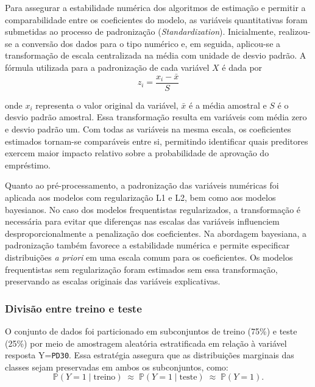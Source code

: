 \documentclass[
  brazilian,
  12pt,
  letterpaper,
  DIV=11,
  numbers=noendperiod]{scrartcl}
\begin{document}
Para assegurar a estabilidade numérica dos algoritmos de estimação e
permitir a comparabilidade entre os coeficientes do modelo, as variáveis
quantitativas foram submetidas ao processo de padronização
(\emph{Standardization}). Inicialmente, realizou-se a conversão dos
dados para o tipo numérico e, em seguida, aplicou-se a transformação de
escala centralizada na média com unidade de desvio padrão. A fórmula
utilizada para a padronização de cada variável \(X\) é dada por
\begin{equation}
z_i = \frac{x_i - \bar{x}}{S}
\label{standardization}
\end{equation}

onde \(x_i\) representa o valor original da variável, \(\bar{x}\) é a
média amostral e \(S\) é o desvio padrão amostral. Essa transformação
resulta em variáveis com média zero e desvio padrão um. Com todas as
variáveis na mesma escala, os coeficientes estimados tornam-se
comparáveis entre si, permitindo identificar quais preditores exercem
maior impacto relativo sobre a probabilidade de aprovação do empréstimo.

Quanto ao pré-processamento, a padronização das variáveis numéricas foi
aplicada aos modelos com regularização L1 e L2, bem como aos modelos
bayesianos. No caso dos modelos frequentistas regularizados, a
transformação é necessária para evitar que diferenças nas escalas das
variáveis influenciem desproporcionalmente a penalização dos
coeficientes. Na abordagem bayesiana, a padronização também favorece a
estabilidade numérica e permite especificar distribuições \emph{a
priori} em uma escala comum para os coeficientes. Os modelos
frequentistas sem regularização foram estimados sem essa transformação,
preservando as escalas originais das variáveis explicativas.

\subsubsection{Divisão entre treino e
teste}\label{divisuxe3o-entre-treino-e-teste}

O conjunto de dados foi particionado em subconjuntos de treino (75\%) e
teste (25\%) por meio de amostragem aleatória estratificada em relação à
variável resposta Y=\texttt{PD30}. Essa estratégia assegura que as
distribuições marginais das classes sejam preservadas em ambos os
subconjuntos, como:
\begin{equation}
\mathbb{P}(Y = 1 \mid \text{treino})
\;\approx\;
\mathbb{P}(Y = 1 \mid \text{teste})
\;\approx\;
\mathbb{P}(Y = 1).
\label{eq:eq-treino-teste}
\end{equation}
\end{document}
